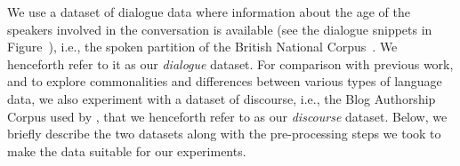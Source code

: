 
        


We use a dataset of dialogue data where information about the age of the speakers involved in the conversation is available (see the dialogue snippets in Figure~), i.e., the spoken partition of the British National Corpus~\citep{love-spoken-bnc-2014}. We henceforth refer to it as our \emph{dialogue} dataset. For comparison with previous work,
and to explore commonalities and differences between various types of language data,
we also experiment with a dataset of discourse, i.e., the Blog Authorship Corpus used by \citet{schler2006effects}, that we henceforth refer to as our \emph{discourse} dataset.
Below, we briefly describe the two datasets along with the pre-processing steps we took to
make the data suitable for 
our experiments.

